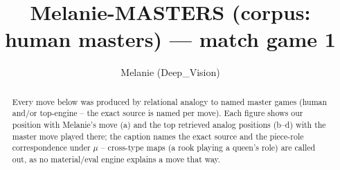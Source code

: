 \documentclass[11pt]{article}
\title{Melanie-MASTERS (corpus: human masters) — match game 1}
\author{Melanie (Deep\_Vision)}
\date{}
\begin{document}
\maketitle

\begin{abstract}Every move below was produced by relational analogy to named master games (human and/or top-engine -- the exact source is named per move). Each figure shows our position with Melanie's move (a) and the top retrieved analog positions (b--d) with the master move played there; the caption names the exact source and the piece-role correspondence under $\mu$ -- cross-type maps (a rook playing a queen's role) are called out, as no material/eval engine explains a move that way.\end{abstract}

\begin{figure}[p]\centering
\begin{subfigure}{0.46\textwidth}\centering
\resizebox{\linewidth}{!}{%
\newchessgame
\chessboard[
  setfen={r1bq1rk1/pppp1ppp/3n1b2/4R3/3P4/8/PPP2PPP/RNBQ1BK1 w - - 1 10},
  showmover=false,
  pgfstyle=straightmove, color=movearrow, markmove={e5-e1}
]}
\caption{}
\end{subfigure}\hfill
\begin{subfigure}{0.46\textwidth}\centering
\resizebox{\linewidth}{!}{%
\newchessgame
\chessboard[
  setfen={r1bqnrk1/pppp1ppp/5b2/4R3/3P4/3B4/PPP2PPP/RNBQ2K1 w - - 3 11},
  showmover=false,
  pgfstyle=straightmove, color=movearrow, markmove={e5-e1}
]}
\caption{}
\end{subfigure}
\\[4pt]
\begin{subfigure}{0.46\textwidth}\centering
\resizebox{\linewidth}{!}{%
\newchessgame
\chessboard[
  setfen={r1bqnrk1/pppp1ppp/5b2/4R3/2PP4/8/PP3PPP/RNBQ1BK1 w - - 1 11},
  showmover=false,
  pgfstyle=straightmove, color=movearrow, markmove={e5-e1}
]}
\caption{}
\end{subfigure}\hfill
\begin{subfigure}{0.46\textwidth}\centering
\resizebox{\linewidth}{!}{%
\newchessgame
\chessboard[
  setfen={r1bqnrk1/pppp1ppp/5b2/4R3/2PP4/8/PP3PPP/RNBQ1BK1 w - - 1 11},
  showmover=false,
  pgfstyle=straightmove, color=movearrow, markmove={e5-e1}
]}
\caption{}
\end{subfigure}

\end{figure}
\end{document}
